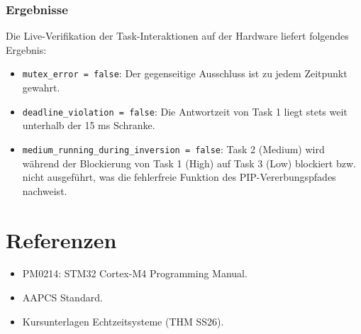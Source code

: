 \documentclass[11pt,a4paper]{article}
\begin{document}
\subsubsection{Ergebnisse}
Die Live-Verifikation der Task-Interaktionen auf der Hardware liefert folgendes Ergebnis:
\begin{itemize}
    \item \texttt{mutex\_error = false}: Der gegenseitige Ausschluss ist zu jedem Zeitpunkt gewahrt.
    \item \texttt{deadline\_violation = false}: Die Antwortzeit von Task 1 liegt stets weit unterhalb der 15 ms Schranke.
    \item \texttt{medium\_running\_during_inversion = false}: Task 2 (Medium) wird während der Blockierung von Task 1 (High) auf Task 3 (Low) blockiert bzw. nicht ausgeführt, was die fehlerfreie Funktion des PIP-Vererbungspfades nachweist.
\end{itemize}

\section{Referenzen}
\begin{itemize}
    \item PM0214: STM32 Cortex-M4 Programming Manual.
    \item AAPCS Standard.
    \item Kursunterlagen Echtzeitsysteme (THM SS26).
\end{itemize}
\end{document}
